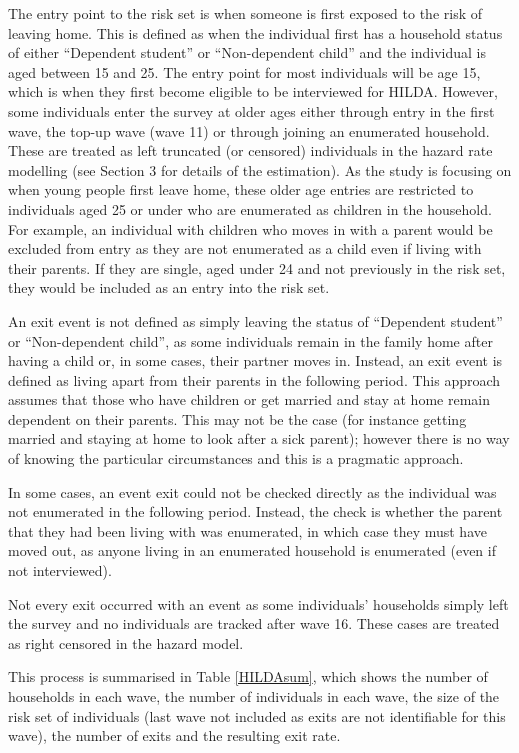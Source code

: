 \documentclass[12pt]{article}
\begin{document}
The entry point to the risk set is when someone is first exposed to the risk of leaving home. This is defined as when the individual first has a household status of either ``Dependent student'' or ``Non-dependent child'' and the individual is aged between 15 and 25. The entry point for most individuals will be age 15, which is when they first become eligible to be interviewed for HILDA. However, some individuals enter the survey at older ages either through entry in the first wave, the top-up wave (wave 11) or through joining an enumerated household. These are treated as left truncated (or censored) individuals in the hazard rate modelling (see Section 3 for details of the estimation). As the study is focusing on when young people first leave home, these older age entries are restricted to individuals aged 25 or under who are enumerated as children in the household. For example, an individual with children who moves in with a parent would be excluded from entry as they are not enumerated as a child even if living with their parents. If they are single, aged under 24 and not previously in the risk set, they would be included as an entry into the risk set.

An exit event is not defined as simply leaving the status of ``Dependent student'' or ``Non-dependent child'', as some individuals remain in the family home after having a child or, in some cases, their partner moves in. Instead, an exit event is defined as living apart from their parents in the following period. This approach assumes that those who have children or get married and stay at home remain dependent on their parents. This may not be the case (for instance getting married and staying at home to look after a sick parent); however there is no way of knowing the particular circumstances and this is a pragmatic approach.

In some cases, an event exit could not be checked directly as the individual was not enumerated in the following period. Instead, the check is whether the parent that they had been living with was enumerated, in which case they must have moved out, as anyone living in an enumerated household is enumerated (even if not interviewed).

Not every exit occurred with an event as some individuals' households simply left the survey and no individuals are tracked after wave 16. These cases are treated as right censored in the hazard model.

This process is summarised in Table \ref{HILDAsum}, which shows the number of households in each wave, the number of individuals in each wave, the size of the risk set of individuals (last wave not included as exits are not identifiable for this wave), the number of exits and the resulting exit rate.
\end{document}
